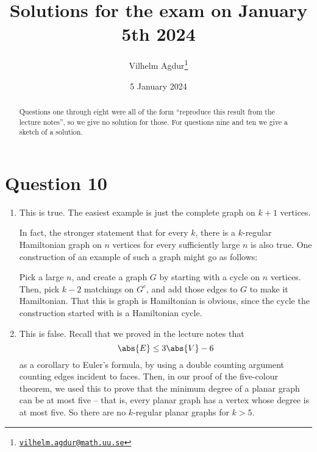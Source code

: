 \documentclass[nobib]{tufte-handout}
\title{Solutions for the exam on January 5th 2024}
\author[Vilhelm Agdur]{Vilhelm Agdur\thanks{\href{mailto:vilhelm.agdur@math.uu.se}{\nolinkurl{vilhelm.agdur@math.uu.se}}}}
\date{5 January 2024}
\begin{document}
\maketitle%

\begin{abstract}
\noindent
Questions one through eight were all of the form ``reproduce this result from the lecture notes'', so we give no solution for those. For questions nine and ten we give a sketch of a solution.
\end{abstract}

\section{Question 10}

\begin{enumerate}[label=\alph*)]
    \item This is true. The easiest example is just the complete graph on $k+1$ vertices.
    
    In fact, the stronger statement that for every $k$, there is a $k$-regular Hamiltonian graph on $n$ vertices for every sufficiently large $n$ is also true. One construction of an example of such a graph might go as follows:
    
    Pick a large $n$, and create a graph $G$ by starting with a cycle on $n$ vertices. Then, pick $k-2$ matchings on $G^c$, and add those edges to $G$ to make it Hamiltonian. That this is graph is Hamiltonian is obvious, since the cycle the construction started with is a Hamiltonian cycle.

    \item This is false. Recall that we proved in the lecture notes that
    $$\abs{E} \leq 3\abs{V} - 6$$
    as a corollary to Euler's formula, by using a double counting argument counting edges incident to faces. Then, in our proof of the five-colour theorem, we used this to prove that the minimum degree of a planar graph can be at most five -- that is, every planar graph has a vertex whose degree is at most five. So there are no $k$-regular planar graphs for $k > 5$.


\end{enumerate}
\end{document}

